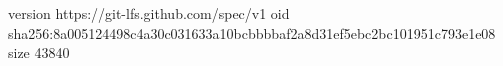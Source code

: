 version https://git-lfs.github.com/spec/v1
oid sha256:8a005124498c4a30c031633a10bcbbbbaf2a8d31ef5ebc2bc101951c793e1e08
size 43840
